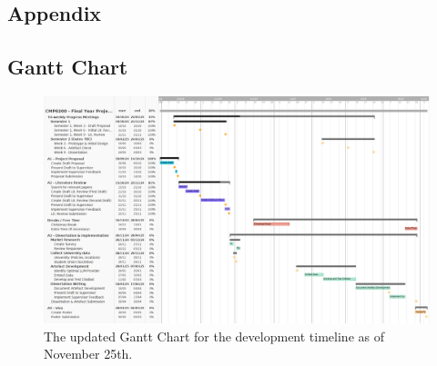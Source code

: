 \documentclass[12pt]{report}
\begin{document}
    \begin{landscape}

    \chapter{Appendix}

    \section{Gantt Chart}

    \begin{figure}[H]
        \centering
        \includegraphics[width=.9\linewidth]{LitReviewGantt2.png}
        \caption{The updated Gantt Chart for the development timeline as of November 25th.}
        \label{fig:gantt}
    \end{figure}

    \end{landscape}

    \printbibliography[keyword={refs}, title = {References}]

    \nocite{IBMAIDef}
    \nocite{ICOAIDef}
    \nocite{IBMGenAI}
    \nocite{MITGenAI}
    \nocite{CloudflareLLM}
    \nocite{IBMNLP}
    \nocite{aws_what_nodate}
    \nocite{databricks_retrieval_2023}
    \nocite{elastic_what_nodate}
    \nocite{confident_ai_llm_nodate}

    \printbibliography[keyword={bib}, title = {Bibliography~~~~~~~~~~~~\small{Sources consulted but not directly cited}}]
\end{document}
